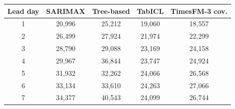 \begin{tabular}{ccccc}
\toprule
Lead day & SARIMAX & Tree-based & TabICL & TimesFM-3 cov. \\
\midrule
1 & 20,996 & 25,212 & 19,060 & 18,557 \\
2 & 26,499 & 27,924 & 21,974 & 22,299 \\
3 & 28,790 & 29,088 & 23,169 & 24,158 \\
4 & 29,967 & 36,844 & 23,747 & 24,924 \\
5 & 31,932 & 32,262 & 24,066 & 26,568 \\
6 & 33,134 & 33,610 & 24,263 & 27,066 \\
7 & 34,377 & 40,543 & 24,099 & 26,744 \\
\bottomrule
\end{tabular}
